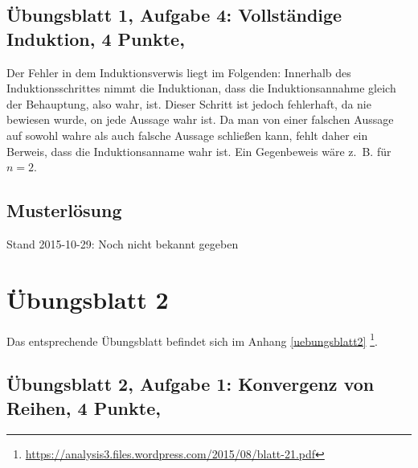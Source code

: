 \documentclass[12pt,a4paper]{report}
\begin{document}
\newpage
\section{Übungsblatt 1, Aufgabe 4: Vollständige Induktion, 4 Punkte, \GruppeA}
Der Fehler in dem Induktionsverwis liegt im Folgenden: Innerhalb des Induktionsschrittes nimmt die Induktionan, dass die Induktionsannahme gleich der Behauptung, also wahr, ist. Dieser Schritt ist jedoch fehlerhaft, da nie bewiesen wurde, on jede Aussage wahr ist. Da man von einer falschen Aussage auf sowohl wahre als auch falsche Aussage schließen kann, fehlt daher ein Berweis, dass die Induktionsanname wahr ist. Ein Gegenbeweis wäre z.~B. für $n=2$.

\newpage
\section{Musterlösung}

Stand 2015-10-29: Noch nicht bekannt gegeben



\chapter{Übungsblatt 2}

	Das entsprechende Übungsblatt befindet sich im Anhang \ref{uebungsblatt2} \footnote{\href{https://analysis3.files.wordpress.com/2015/08/blatt-2.pdf}{https://analysis3.files.wordpress.com/2015/08/blatt-21.pdf}}.
	
	\newpage		
	\section{Übungsblatt 2, Aufgabe 1: Konvergenz von Reihen, 4 Punkte, \GruppeA}
	
\end{document}
